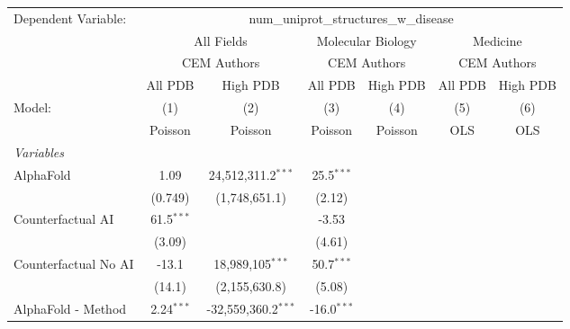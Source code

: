 \begingroup
\centering
\begin{tabular}{lcccccc}
   \tabularnewline \midrule \midrule
   Dependent Variable: & \multicolumn{6}{c}{num\_uniprot\_structures\_w\_disease}\\
 & \multicolumn{2}{c}{All Fields} & \multicolumn{2}{c}{Molecular Biology} & \multicolumn{2}{c}{Medicine} \\
\cmidrule(lr){2-3} \cmidrule(lr){4-5} \cmidrule(lr){6-7}
 & \multicolumn{2}{c}{CEM Authors} & \multicolumn{2}{c}{CEM Authors} & \multicolumn{2}{c}{CEM Authors} \\
\cmidrule(lr){2-3} \cmidrule(lr){4-5} \cmidrule(lr){6-7}
 & \multicolumn{1}{c}{All PDB} & \multicolumn{1}{c}{High PDB} & \multicolumn{1}{c}{All PDB} & \multicolumn{1}{c}{High PDB} & \multicolumn{1}{c}{All PDB} & \multicolumn{1}{c}{High PDB} \\
\cmidrule(lr){2-2} \cmidrule(lr){3-3} \cmidrule(lr){4-4} \cmidrule(lr){5-5} \cmidrule(lr){6-6} \cmidrule(lr){7-7}
   Model:                                                     & (1)           & (2)                   & (3)           & (4)     & (5)  & (6)\\  
                                                              &  Poisson      & Poisson               & Poisson       & Poisson & OLS  & OLS\\  
   \midrule
   \emph{Variables}\\
   AlphaFold                                                  & 1.09          & 24,512,311.2$^{***}$  & 25.5$^{***}$  &         &      &   \\   
                                                              & (0.749)       & (1,748,651.1)         & (2.12)        &         &      &   \\   
   Counterfactual AI                                          & 61.5$^{***}$  &                       & -3.53         &         &      &   \\   
                                                              & (3.09)        &                       & (4.61)        &         &      &   \\   
   Counterfactual No AI                                       & -13.1         & 18,989,105$^{***}$    & 50.7$^{***}$  &         &      &   \\   
                                                              & (14.1)        & (2,155,630.8)         & (5.08)        &         &      &   \\   
   AlphaFold - Method                                         & 2.24$^{***}$  & -32,559,360.2$^{***}$ & -16.0$^{***}$ &         &      &   \\   

\end{tabular}
